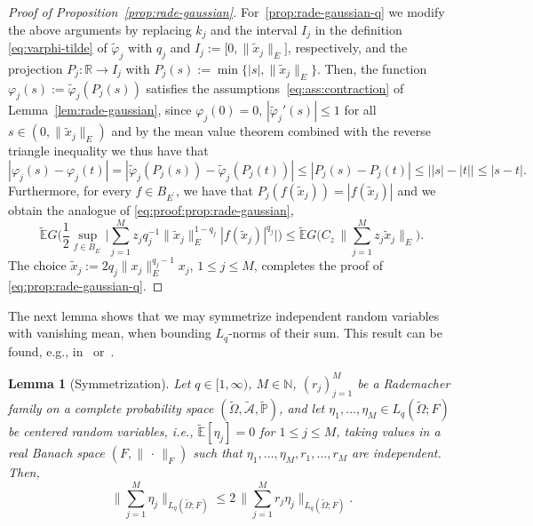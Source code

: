 \documentclass[reqno]{amsart}
\numberwithin{equation}{section}
\newcommand{\bbE}{\mathbb{E}}
\newcommand{\bbN}{\mathbb{N}}
\newcommand{\bbP}{\mathbb{P}}
\newcommand{\bbR}{\mathbb{R}}
\newcommand{\cA}{\mathcal{A}}
\newcommand{\Omegat}{\widetilde{\Omega}}
\newcommand{\cAt}{\widetilde{\cA}}
\newcommand{\bbPt}{\widetilde{\bbP}}
\newcommand{\bbEt}{\widetilde{\bbE}}
\newcommand{\norm}[2]{     \| #1       \|_{ #2 }}
\newcommand{\dual}[1]{{#1}^{\prime}}
\newcommand{\from}{\colon}
\newtheorem{lemma}{Lemma}[section]
\theoremstyle{remark}
\theoremstyle{definition}
\begin{document}
\begin{proof}[Proof of Proposition~\ref{prop:rade-gaussian}]
	For~\ref{prop:rade-gaussian-q} 
	we modify the above arguments 
	by replacing $k_j$ 
	and 
	the interval $I_j$ 
	in the definition 
	\eqref{eq:varphi-tilde} 
	of $\widetilde{\varphi}_j$
	with $q_j$ 
	and $I_j := \bigl[ 0, \norm{\widetilde{x}_j}{E} \bigr]$, 
	respectively, 
	and 
	the projection $P_j\from\bbR\to I_j$ 
	with 
	$P_j(s) := \min\{|s|, \norm{\widetilde{x}_j}{E}\}$. 
	Then, the function $\varphi_j(s) := \widetilde{\varphi}_j( P_j(s) )$ 
	satisfies the assumptions~\eqref{eq:ass:contraction} 
	of Lemma~\ref{lem:rade-gaussian}, 
	since $\varphi_j(0) = 0$, 
	$|\widetilde{\varphi}_j'(s)| \leq 1$ 
	for all $s\in(0,\norm{\widetilde{x}_j}{E})$ and 
	by the mean value theorem 
	combined with the reverse triangle inequality 
	we thus have that 
	\[
	|\varphi_j(s) - \varphi_j(t) | 
	= 
	|\widetilde{\varphi}_j(P_j(s)) - \widetilde{\varphi}_j(P_j(t)) | 
	\leq 
	| P_j(s) - P_j(t) | 
	\leq 
	\bigl| |s| - |t| \bigr| 
	\leq 
	|s-t|. 
	\]
	Furthermore, for every $f\in B_{\dual{E}}$, we have that  
	$P_j(f(\widetilde{x}_j)) = |f(\widetilde{x}_j)|$ 
	and we obtain the analogue 
	of \eqref{eq:proof:prop:rade-gaussian}, 
	\[
	\widetilde{\bbE}  
	G\Biggl( \frac{1}{2} 
	\sup_{f\in B_{\dual{E}}} 
	\biggl| 
	\sum_{j=1}^M 
	z_j q_j^{-1} \norm{\widetilde{x}_j}{E}^{1-q_j} |f(\widetilde{x}_j)|^{q_j} \biggr| 
	\Biggr) 
	\leq 
	\widetilde{\bbE}   
	G\Biggl(  
	C_z \, 
	\biggl\| 
	\sum_{j=1}^M 
	z_j \widetilde{x}_j \biggr\|_E
	\Biggr).  
	\]
	The choice 
	$\widetilde{x}_j := 2 q_j \norm{x_j}{E}^{q_j-1} x_j$, 
	$1\leq j\leq M$, completes the proof 
	of \eqref{eq:prop:rade-gaussian-q}. 
\end{proof} 

The next lemma shows that we may 
symmetrize independent random variables 
with vanishing mean,
when bounding $L_q$-norms of their sum. 
This result can be found, e.g., 
in~\cite[Lemma~6.3]{LedouxTalagrand2011}  
or~\cite[Lemma~5.9]{CoxEtAl2021}.  

\begin{lemma}[Symmetrization]
	\label{lem:symmetrization} 
	Let  $q\in[1,\infty)$, $M\in\bbN$, $(r_j)_{j=1}^M$ be 
	a Rademacher family on a complete probability space 
	$(\Omegat,\cAt,\bbPt)$, 
	and let $\eta_1,\ldots,\eta_M\in L_q(\Omegat;F)$ be 
	centered random variables, 
	i.e., $\bbEt[\eta_j]=0$ for $1\leq j \leq M$, 
	taking values 
	in a real Banach space $(F,\norm{\,\cdot\,}{F})$ 
	such that $\eta_1,\ldots,\eta_M, r_1, \ldots, r_M$ are independent. 
	Then, 
	\[
	\biggl\| 
	\sum_{j=1}^M \eta_j 
	\biggr\|_{L_q(\Omegat;F)} 
	\leq 
	2 \, 
	\biggl\| 
	\sum_{j=1}^M r_j \eta_j 
	\biggr\|_{L_q(\Omegat;F)} . 
	\]
\end{lemma} 
\end{document}
